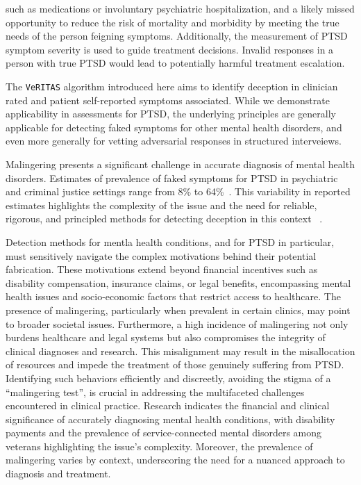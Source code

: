 \documentclass[onecolumn,10pt]{IEEEtran}
\def\vrts{\texttt{VeRITAS}\xspace}
\begin{document}
{such as medications or involuntary psychiatric hospitalization, and a likely missed opportunity to reduce the risk of mortality and morbidity by meeting the true needs of the person feigning symptoms. Additionally, the measurement of PTSD symptom severity is used to guide treatment decisions. Invalid responses in a person with true PTSD would lead to potentially harmful treatment escalation.
}



The  \vrts algorithm introduced here aims to identify deception in clinician rated and patient self-reported symptoms associated. While we demonstrate applicability in assessments for PTSD, the underlying principles are generally applicable for detecting faked symptoms for other mental health disorders, and even more  generally for vetting adversarial responses in structured interveiews.

Malingering presents a significant challenge in accurate diagnosis of mental health disorders. Estimates of prevalence of faked symptoms for PTSD in psychiatric and criminal justice settings range from 8\% to 64\%~\cite{mcdermott2013malingering,schmidt2020base,matto2019systematic}.  This variability in reported estimates highlights the complexity of the issue and the need for reliable, rigorous, and principled methods for detecting deception in this context ~\cite{DePaulo2003}.

Detection methods for mentla health conditions, and for PTSD in particular,  must sensitively navigate the complex motivations behind their potential fabrication. These motivations extend beyond financial incentives such as disability compensation, insurance claims, or legal benefits, encompassing mental health issues and socio-economic factors that restrict access to healthcare. The presence of malingering, particularly when prevalent in certain clinics, may point to broader societal issues. Furthermore, a high incidence of malingering not only burdens healthcare and legal systems but also compromises the integrity of clinical diagnoses and research. This misalignment may result in the misallocation of resources and impede the treatment of those genuinely suffering from PTSD. Identifying such behaviors efficiently and discreetly, avoiding the stigma of a ``malingering test'', is crucial in addressing the multifaceted challenges encountered in clinical practice. Research indicates the financial and clinical significance of accurately diagnosing mental health conditions, with disability payments and the prevalence of service-connected mental disorders among veterans highlighting the issue's complexity. Moreover, the prevalence of malingering varies by context, underscoring the need for a nuanced approach to diagnosis and treatment.
\end{document}
